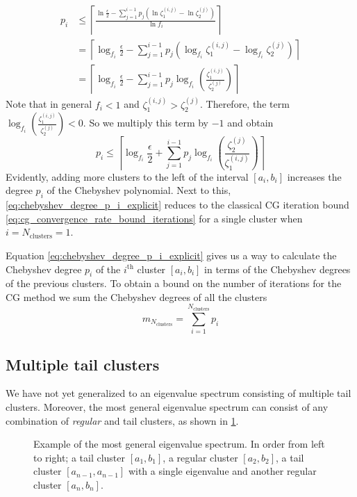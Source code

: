 \begin{align*}
    p_i & \leq \left\lceil\frac{\ln{\frac{\epsilon}{2}} - \sum_{j=1}^{i-1} p_j\left(\ln{\zeta^{(i,j)}_1} - \ln{\zeta^{(j)}_2} \right)}{\ln{f_i}}\right\rceil  \\
        & = \left\lceil\log_{f_i}{\frac{\epsilon}{2}} - \sum_{j=1}^{i-1} p_j\left(\log_{f_i}{\zeta^{(i,j)}_1} - \log_{f_i}{\zeta^{(j)}_2} \right)\right\rceil \\
        & = \left\lceil\log_{f_i}{\frac{\epsilon}{2}} - \sum_{j=1}^{i-1} p_j\log_{f_i}\left(\frac{\zeta^{(i,j)}_1}{\zeta^{(j)}_2}\right)\right\rceil
\end{align*}
Note that in general $f_i < 1$ and $\zeta^{(i,j)}_1 > \zeta^{(j)}_2$. Therefore, the term $\log_{f_i}{\left(\frac{\zeta^{(i,j)}_1}{\zeta^{(j)}_2}\right)} < 0$. So we multiply this term by $-1$ and obtain
\begin{equation}
    p_i \leq \left\lceil\log_{f_i}{\frac{\epsilon}{2}} + \sum_{j=1}^{i-1} p_j\log_{f_i}\left(\frac{\zeta^{(j)}_2}{\zeta^{(i,j)}_1}\right)\right\rceil
    \label{eq:chebyshev_degree_p_i_explicit}
\end{equation}
Evidently, adding more clusters to the left of the interval $[a_i,b_i]$ increases the degree $p_i$ of the Chebyshev polynomial. Next to this, \cref{eq:chebyshev_degree_p_i_explicit} reduces to the classical CG iteration bound \cref{eq:cg_convergence_rate_bound_iterations} for a single cluster when $i = N_{\text{clusters}} = 1$.

Equation \ref{eq:chebyshev_degree_p_i_explicit} gives us a way to calculate the Chebyshev degree $p_i$ of the $i^{\text{th}}$ cluster $[a_i,b_i]$ in terms of the Chebyshev degrees of the previous clusters. To obtain a bound on the number of iterations for the CG method we sum the Chebyshev degrees of all the clusters
\begin{equation}
    m_{N_{\text{clusters}}} = \sum_{i=1}^{N_{\text{clusters}}} p_i
    \label{eq:cg_iteration_bound_multiple_clusters}
\end{equation}

\subsection{Multiple tail clusters}\label{sec:cg_single_eigenvalue_tail_clusters}
We have not yet generalized to an eigenvalue spectrum consisting of multiple tail clusters. Moreover, the most general eigenvalue spectrum can consist of any combination of \textit{regular} and tail clusters, as shown in \cref{fig:general_spectrum}.
\begin{figure}[H]
    \centering
    
    \caption{Example of the most general eigenvalue spectrum. In order from left to right; a tail cluster $[a_1, b_1]$, a regular cluster $[a_2, b_2]$, a tail cluster $[a_{n-1}, a_{n-1}]$ with a single eigenvalue and another regular cluster $[a_n, b_n]$.}
    \label{fig:general_spectrum}
\end{figure}

